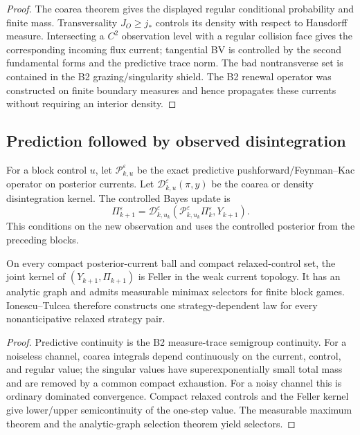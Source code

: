 \begin{proof}
The coarea theorem gives the displayed regular conditional probability and
finite mass.  Transversality $J_O\ge j_*$ controls its density with respect to
Hausdorff measure.  Intersecting a $C^2$ observation level with a regular
collision face gives the corresponding incoming flux current; tangential BV
is controlled by the second fundamental forms and the predictive trace norm.
The bad nontransverse set is contained in the B2 grazing/singularity shield.
The B2 renewal operator was constructed on finite boundary measures and hence
propagates these currents without requiring an interior density.
\end{proof}

\subsection{Prediction followed by observed disintegration}

For a block control $u$, let
$\mathcal P_{k,u}^\varepsilon$ be the exact predictive pushforward/Feynman--Kac
operator on posterior currents.  Let
$\mathcal D_{k,u}^\varepsilon(\pi,y)$ be the coarea or density disintegration
kernel.  The controlled Bayes update is
\[
 \Pi_{k+1}^\varepsilon
 =\mathcal D_{k,u_k}^\varepsilon
  (\mathcal P_{k,u_k}^\varepsilon\Pi_k^\varepsilon,Y_{k+1}).
\]
This conditions on the new observation and uses the controlled posterior from
the preceding blocks.

\begin{theorem}
\label{thm:r7-c1-belief}
On every compact posterior-current ball and compact relaxed-control set, the
joint kernel of $(Y_{k+1},\Pi_{k+1})$ is Feller in the weak current topology.
It has an analytic graph and admits measurable minimax selectors for finite
block games.  Ionescu--Tulcea therefore constructs one strategy-dependent law
for every nonanticipative relaxed strategy pair.
\end{theorem}

\begin{proof}
Predictive continuity is the B2 measure-trace semigroup continuity.  For a
noiseless channel, coarea integrals depend continuously on the current, control,
and regular value; the singular values have superexponentially small total
mass and are removed by a common compact exhaustion.  For a noisy channel this
is ordinary dominated convergence.  Compact relaxed controls and the Feller
kernel give lower/upper semicontinuity of the one-step value.  The measurable
maximum theorem and the analytic-graph selection theorem yield selectors.
\end{proof}

